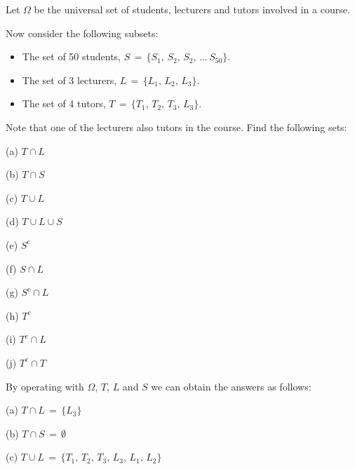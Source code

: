 \begin{ExerciseList}

\Exercise
Let $\Omega$ be the universal set of students, lecturers and tutors involved in a course.

Now consider the following subsets:
\begin{itemize}
\item The set of 50 students, $S\,=\, \{S_1,\, S_2,\, S_2,\,\dots \, S_{50}\}$.

\item The set of 3 lecturers, $L\,=\, \{L_1,\,L_2,\, L_3\}$.

\item The set of 4 tutors, $T\,=\, \{T_1,\,T_2,\, T_3,\, L_3\}$.
\end{itemize}
Note that one of the lecturers also tutors in the course. Find the following sets:

\be

\item[(a)] $T \cap L$

\item[(b)] $T \cap S$

\item[(c)] $T \cup L$

\item[(d)] $T \cup L \cup S$

\item[(e)] $S^c$

\item[(f)] $S \cap L$

\item[(g)] $S^c\cap L$

\item[(h)] $T^c$

\item[(i)] $T^c\cap L$


\item[(j)] $T^c\cap T$

\ee\ecols

\Answer
By operating with $\Omega$, $T$, $L$ and $S$ we can obtain the answers as follows:

{\be

\item[(a)] $T \cap L\,=\, \{L_3\}$

\item[(b)] $T \cap S\,=\, \emptyset$

\item[(c)] $T \cup L\,=\, \{ T_1,\,T_2,\, T_3,\, L_3,\, L_1,\, L_2\}$

}
\end{ExerciseList}
